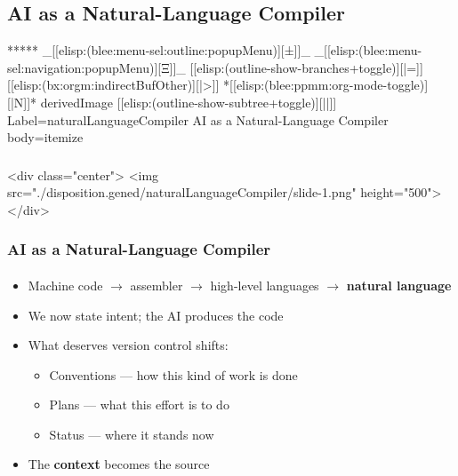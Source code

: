 \begin{whenOrg}
\section{AI as a Natural-Language Compiler}

\begin{whenOrg}
*****  _[[elisp:(blee:menu-sel:outline:popupMenu)][±]]_ _[[elisp:(blee:menu-sel:navigation:popupMenu)][Ξ]]_ [[elisp:(outline-show-branches+toggle)][|=]] [[elisp:(bx:orgm:indirectBufOther)][|>]] *[[elisp:(blee:ppmm:org-mode-toggle)][|N]]*  derivedImage [[elisp:(outline-show-subtree+toggle)][||]] Label=naturalLanguageCompiler AI as a Natural-Language Compiler body=itemize
\end{whenOrg}

\begin{htmlonly}

\begin{frame}[fragile,plain,label=naturalLanguageCompiler]
    \frametitle{}
    \framesubtitle{}
    \begin{rawhtml}
<div class="center">
<img src="./disposition.gened/naturalLanguageCompiler/slide-1.png" height="500">
</div>
    \end{rawhtml}
\end{frame}
\end{htmlonly}

\begin{verblatex}

\begin{frame}[fragile,plain,label=naturalLanguageCompiler]
    \frametitle{AI as a Natural-Language Compiler}
    \framesubtitle{}

\begin{itemize}
  \item Machine code $\rightarrow$ assembler $\rightarrow$ high-level languages
    $\rightarrow$ \textbf{natural language}
  \item We now state intent; the AI produces the code
  \item What deserves version control shifts:
    \begin{itemize}
    \item Conventions --- how this kind of work is done
    \item Plans --- what this effort is to do
    \item Status --- where it stands now
    \end{itemize}
  \item The \textbf{context} becomes the source
  \end{itemize}


\end{frame}
\end{verblatex}
\end{whenOrg}
